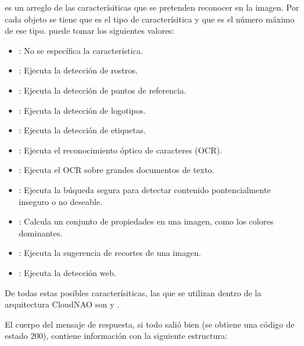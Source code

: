  es un arreglo de las caracterísiticas que se pretenden reconocer
en la imagen. Por cada objeto se tiene  que es el tipo de caracterísitica
y  que es el número máximo de ese tipo.  puede tomar
los siguientes valores:
\begin{itemize}
\item {} 
: No se específica la característica.

\item {} 
: Ejecuta la detección de rostros.

\item {} 
: Ejecuta la detección de puntos de referencia.

\item {} 
: Ejecuta la detección de logotipos.

\item {} 
: Ejecuta la detección de etiquetas.

\item {} 
: Ejecuta el reconocimiento óptico de caracteres (OCR).

\item {} 
: Ejecuta el OCR sobre grandes documentos de texto.

\item {} 
: Ejecuta la búqueda segura para detectar contenido pontencialmente inseguro o no deseable.

\item {} 
: Calcula un conjunto de propiedades en una imagen, como los colores dominantes.

\item {} 
: Ejecuta la sugerencia de recortes de una imagen.

\item {} 
: Ejecuta la detección web.

\end{itemize}

De todas estas posibles caracterísiticas, las que se utilizan dentro de la arquitectura
CloudNAO son  y .

El cuerpo del mensaje de respuesta, si todo salió bien (se obtiene una código
de estado 200), contiene información
con la siguiente estructura:

